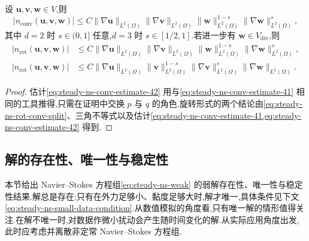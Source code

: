 \begin{lemma}[对流项的估计]\label{lem:steady-ns-convection-estimates-4}
设 $\bm{u},\bm{v},\bm{w}\in V$,则
\begin{equation}\label{eq:steady-ns-conv-estimate-42}
  |n_{\mathrm{conv}}(\bm{u},\bm{v},\bm{w})|
    \le C\|\nabla\bm{u}\|_{L^2(\Omega)}
       \|\nabla\bm{v}\|_{L^2(\Omega)}
       \|\bm{w}\|_{L^2(\Omega)}^{1-s}
       \|\nabla\bm{w}\|_{L^2(\Omega)}^s,
\end{equation}
其中 $d=2$ 时 $s\in(0,1]$ 任意,$d=3$ 时 $s\in[1/2,1]$.若进一步有 $\bm{w}\in V_{\mathrm{div}}$,则
\begin{align}
  |n_{\mathrm{rot}}(\bm{u},\bm{v},\bm{w})|
    &\le C\|\nabla\bm{u}\|_{L^2(\Omega)}
       \|\nabla\bm{v}\|_{L^2(\Omega)}
       \|\bm{w}\|_{L^2(\Omega)}^{1-s}
       \|\nabla\bm{w}\|_{L^2(\Omega)}^s,
       \label{eq:steady-ns-rot-estimate-43}\\
  |n_{\mathrm{rot}}(\bm{u},\bm{v},\bm{w})|
    &\le C\|\nabla\bm{u}\|_{L^2(\Omega)}
       \|\bm{v}\|_{L^2(\Omega)}^{1-s}
       \|\nabla\bm{v}\|_{L^2(\Omega)}^s
       \|\nabla\bm{w}\|_{L^2(\Omega)}.
       \label{eq:steady-ns-rot-estimate-44}
\end{align}
\end{lemma}

\begin{proof}
估计\cref{eq:steady-ns-conv-estimate-42} 用与\cref{eq:steady-ns-conv-estimate-41} 相同的工具推得,只需在证明中交换 $p$ 与 $q$ 的角色.旋转形式的两个结论由\cref{eq:steady-ns-rot-conv-split}、三角不等式以及估计\cref{eq:steady-ns-conv-estimate-41,eq:steady-ns-conv-estimate-42} 得到.
\end{proof}

\subsection{解的存在性、唯一性与稳定性}\label{subsec:steady-ns-existence-uniqueness-stability}

\begin{note}[内容]\label{note:steady-ns-existence-contents}\label{note:steady-ns-small-viscosity}
本节给出 Navier--Stokes 方程组\cref{eq:steady-ns-weak} 的弱解存在性、唯一性与稳定性结果.解总是存在;只有在外力足够小、黏度足够大时,解才唯一,具体条件见下文\cref{eq:steady-ns-small-data-condition}.从数值模拟的角度看,只有唯一解的情形值得关注.在解不唯一时,对数据作微小扰动会产生随时间变化的解.从实际应用角度出发,此时应考虑并离散非定常 Navier--Stokes 方程组.
\end{note}

